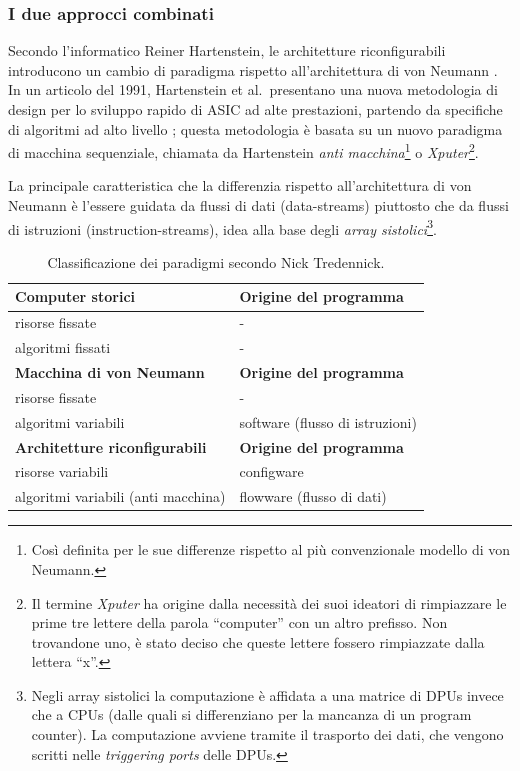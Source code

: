 \subsubsection{I due approcci combinati}
Secondo l'informatico Reiner Hartenstein, le architetture riconfigurabili introducono un
cambio di paradigma rispetto all'architettura di von Neumann
\cite{HartensteinParadigmShift}. In un articolo del 1991, Hartenstein et al.~presentano
una nuova metodologia di design per lo sviluppo rapido di \ac{ASIC} ad alte prestazioni,
partendo da specifiche di algoritmi ad alto livello \cite{HartensteinNovelASICDesign};
questa metodologia è basata su un nuovo paradigma di macchina sequenziale, chiamata da
Hartenstein \emph{anti macchina}\footnote{Così definita per le sue differenze rispetto al
più convenzionale modello di von Neumann.} o \emph{Xputer}\footnote{Il termine
\emph{Xputer} ha origine dalla necessità dei suoi ideatori di rimpiazzare le prime tre
lettere della parola ``computer'' con un altro prefisso. Non trovandone uno, è stato
deciso che queste lettere fossero rimpiazzate dalla lettera ``x''.}.

La principale caratteristica che la differenzia rispetto all'architettura di von Neumann è
l'essere guidata da flussi di dati (data-streams) piuttosto che da flussi di istruzioni
(instruction-streams), idea alla base degli \emph{array sistolici}\footnote{Negli array
sistolici la computazione è affidata a una matrice di \acp{DPU} invece che a \acsp{CPU}
(dalle quali si differenziano per la mancanza di un program counter). La computazione
avviene tramite il trasporto dei dati, che vengono scritti nelle \emph{triggering ports}
delle \acp{DPU}.}.



\begin{table}[ht]
\begin{center}
 \begin{tabular}{l | l}
 \hline
 \textbf{Computer storici} & \textbf{Origine del programma}\\
 \hline
 risorse fissate & -\\
 algoritmi fissati & -\\
 \hline
 \textbf{Macchina di von Neumann} & \textbf{Origine del programma}\\
 \hline
 risorse fissate & -\\
 algoritmi variabili & software (flusso di istruzioni)\\
 \hline
 \textbf{Architetture riconfigurabili} & \textbf{Origine del programma}\\
 \hline
 risorse variabili & configware\\
 algoritmi variabili (anti macchina) & flowware (flusso di dati)
 \end{tabular}
 \caption{Classificazione dei paradigmi secondo Nick Tredennick.}
 \label{tab:TredennickClassificationScheme}
 \end{center}
\end{table}

